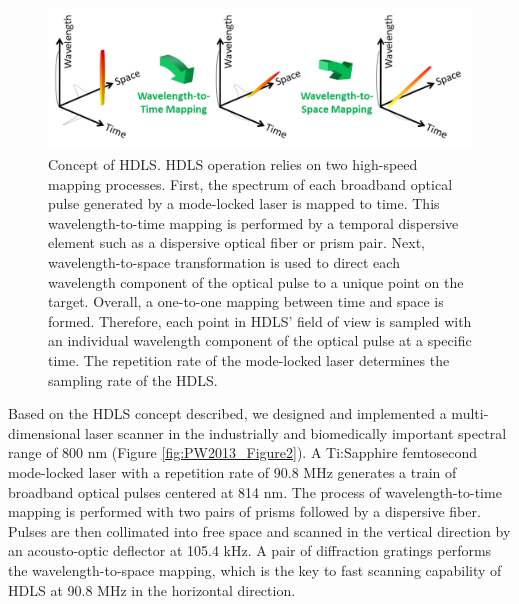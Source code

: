 \begin{figure}[htb!]
\centering
\includegraphics[scale=0.65]{PW2013/Figure1.png}
\caption{Concept of HDLS. HDLS operation relies on two high-speed mapping processes. First, the spectrum of each broadband optical pulse generated by a mode-locked laser is mapped to time. This wavelength-to-time mapping is performed by a temporal dispersive element such as a dispersive optical fiber or prism pair. Next, wavelength-to-space transformation is used to direct each wavelength component of the optical pulse to a unique point on the target. Overall, a one-to-one mapping between time and space is formed. Therefore, each point in HDLS’ field of view is sampled with an individual wavelength component of the optical pulse at a specific time. The repetition rate of the mode-locked laser determines the sampling rate of the HDLS.}
\label{fig:PW2013_Figure1}
\end{figure}

Based on the HDLS concept described, we designed and implemented a multi-dimensional laser scanner in the industrially and biomedically important spectral range of 800 nm (Figure \ref{fig:PW2013_Figure2}). A Ti:Sapphire femtosecond mode-locked laser with a repetition rate of 90.8 MHz generates a train of broadband optical pulses centered at 814 nm. The process of wavelength-to-time mapping is performed with two pairs of prisms followed by a dispersive fiber. Pulses are then collimated into free space and scanned in the vertical direction by an acousto-optic deflector at 105.4 kHz. A pair of diffraction gratings performs the wavelength-to-space mapping, which is the key to fast scanning capability of HDLS at 90.8 MHz in the horizontal direction. 

